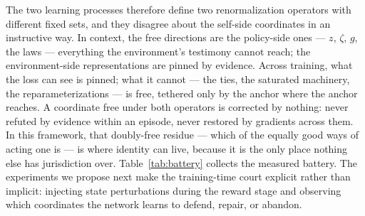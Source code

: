 \documentclass[11pt]{article}
\begin{document}
The two learning processes therefore define two renormalization operators with different fixed sets, and they disagree about the self-side coordinates in an instructive way. In context, the free directions are the policy-side ones --- $z$, $\zeta$, $g$, the laws --- everything the environment's testimony cannot reach; the environment-side representations are pinned by evidence. Across training, what the loss can see is pinned; what it cannot --- the ties, the saturated machinery, the reparameterizations --- is free, tethered only by the anchor where the anchor reaches. A coordinate free under both operators is corrected by nothing: never refuted by evidence within an episode, never restored by gradients across them. In this framework, that doubly-free residue --- which of the equally good ways of acting one is --- is where identity can live, because it is the only place nothing else has jurisdiction over. Table~\ref{tab:battery} collects the measured battery. The experiments we propose next make the training-time court explicit rather than implicit: injecting state perturbations during the reward stage and observing which coordinates the network learns to defend, repair, or abandon.
\end{document}
